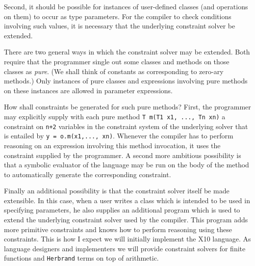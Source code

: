 \documentclass[nocopyrightspace,preprint,9pt]{sigplanconf}
\newcommand\Xten{{X10}}
\begin{document}
Second, it should be possible for instances of user-defined classes
(and operations on them) to occur as type parameters. For the compiler
to check conditions involving such values, it is necessary that the
underlying constraint solver be extended.

There are two general ways in which the constraint solver may be
extended.  Both require that the programmer single out some classes
and methods on those classes as {\em pure}. (We shall think of
constants as corresponding to zero-ary methods.) Only instances of
pure classes and expressions involving pure methods on these instances
are allowed in parameter expressions.

How shall constraints be generated for such pure methods? First, the
programmer may explicitly supply with each pure method {\tt T m(T1 x1,
..., Tn xn)} a constraint on {\tt n+2} variables in the constraint
system of the underlying solver that is entailed by {\tt y =
o.m(x1,..., xn)}. Whenever the compiler has to perform reasoning on an
expression involving this method invocation, it uses the constraint
supplied by the programmer. A second more ambitious possibility is
that a symbolic evaluator of the language may be run on the body of
the method to automatically generate the corresponding constraint.

Finally an additional possibility is that the constraint solver itself
be made extensible. In this case, when a user writes a class which is
intended to be used in specifying parameters, he also supplies an
additional program which is used to extend the underlying constraint
solver used by the compiler. This program adds more primitive
constraints and knows how to perform reasoning using these
constraints. This is how I expect we will initially implement the
\Xten{} language. As language designers and implementers we will
provide constraint solvers for finite functions and {\tt Herbrand}
terms on top of arithmetic.
\end{document}
